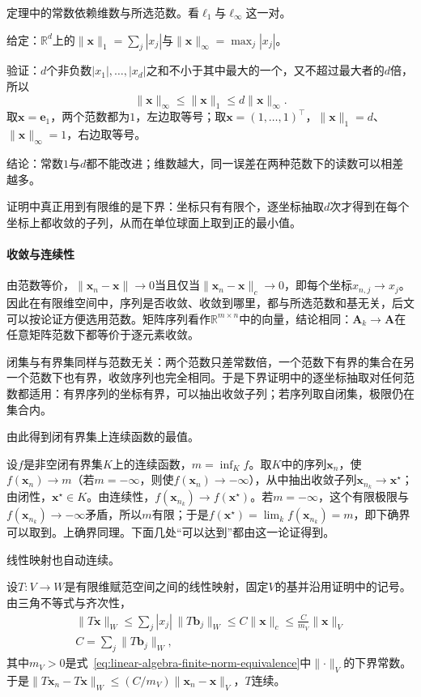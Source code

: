 定理中的常数依赖维数与所选范数。看$\ell_1$与$\ell_\infty$这一对。
\begin{example}
\label{ex:ls-l1-linf-constants}
给定：$\mathbb R^d$上的$\lVert\bm x\rVert_1=\sum_j|x_j|$与$\lVert\bm x\rVert_\infty=\max_j|x_j|$。

验证：$d$个非负数$|x_1|,\ldots,|x_d|$之和不小于其中最大的一个，又不超过最大者的$d$倍，所以
\[
 \lVert\bm x\rVert_\infty\leq\lVert\bm x\rVert_1\leq d\lVert\bm x\rVert_\infty .
\]
取$\bm x=\bm e_1$，两个范数都为$1$，左边取等号；取$\bm x=(1,\ldots,1)^\top$，$\lVert\bm x\rVert_1=d$、$\lVert\bm x\rVert_\infty=1$，右边取等号。

结论：常数$1$与$d$都不能改进；维数越大，同一误差在两种范数下的读数可以相差越多。
\end{example}
证明中真正用到有限维的是下界：坐标只有有限个，逐坐标抽取$d$次才得到在每个坐标上都收敛的子列，从而在单位球面上取到正的最小值。

\paragraph{收敛与连续性}
由范数等价，$\lVert\bm x_n-\bm x\rVert\to0$当且仅当$\lVert\bm x_n-\bm x\rVert_c\to0$，即每个坐标$x_{n,j}\to x_j$。因此在有限维空间中，序列是否收敛、收敛到哪里，都与所选范数和基无关，后文可以按论证方便选用范数。矩阵序列看作$\mathbb R^{m\times n}$中的向量，结论相同：$\bm A_k\to\bm A$在任意矩阵范数下都等价于逐元素收敛。

闭集与有界集同样与范数无关：两个范数只差常数倍，一个范数下有界的集合在另一个范数下也有界，收敛序列也完全相同。于是下界证明中的逐坐标抽取对任何范数都适用：有界序列的坐标有界，可以抽出收敛子列；若序列取自闭集，极限仍在集合内。

由此得到闭有界集上连续函数的最值。

设$f$是非空闭有界集$K$上的连续函数，$m=\inf_{K}f$。取$K$中的序列$\bm x_n$，使$f(\bm x_n)\to m$（若$m=-\infty$，则使$f(\bm x_n)\to-\infty$），从中抽出收敛子列$\bm x_{n_k}\to\bm x^\star$；由闭性，$\bm x^\star\in K$。由连续性，$f(\bm x_{n_k})\to f(\bm x^\star)$。若$m=-\infty$，这个有限极限与$f(\bm x_{n_k})\to-\infty$矛盾，所以$m$有限；于是$f(\bm x^\star)=\lim_kf(\bm x_{n_k})=m$，即下确界可以取到。上确界同理。下面几处“可以达到”都由这一论证得到。

线性映射也自动连续。

设$T:V\to W$是有限维赋范空间之间的线性映射，固定$V$的基并沿用证明中的记号。由三角不等式与齐次性，
\[
\begin{gathered}
\lVert T\bm x\rVert_W\leq\sum_j|x_j|\,\lVert T\bm b_j\rVert_W\leq C\lVert\bm x\rVert_c\leq\frac C{m_V}\lVert\bm x\rVert_V\\
C=\sum_j\lVert T\bm b_j\rVert_W,
\end{gathered}
\]
其中$m_V>0$是式~\eqref{eq:linear-algebra-finite-norm-equivalence}中$\lVert\cdot\rVert_V$的下界常数。于是$\lVert T\bm x_n-T\bm x\rVert_W\leq(C/m_V)\lVert\bm x_n-\bm x\rVert_V$，$T$连续。

